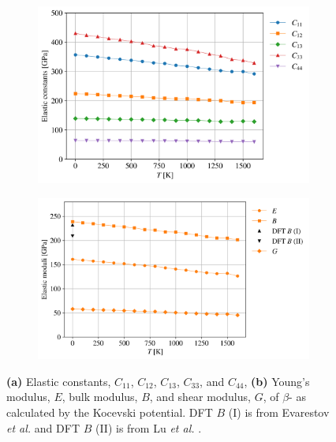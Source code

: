 \documentclass[preprint, 12pt]{elsarticle}
\begin{document}
\begin{figure}[h!]
\centering
\begin{subfigure}{0.43\textwidth}
    \includegraphics[width=\textwidth]{ElasticConstantsU2N3.png}
    \caption{}
    \label{Fig:ElasConstU2N3}
\end{subfigure}
\hfill
\begin{subfigure}{0.47\textwidth}
    \includegraphics[width=\textwidth]{ElasticModuliU2N3.png}
    \caption{}
    \label{Fig:ElasModU2N3}
\end{subfigure}
\hfill
\caption{\textbf{(a)} Elastic constants, $C_{11}$, $C_{12}$, $C_{13}$, $C_{33}$, and $C_{44}$, \textbf{(b)} Young's modulus, $E$, bulk modulus, $B$, and shear modulus, $G$, of $\beta$- as calculated by the Kocevski potential. DFT $B$ (I) is from Evarestov \textit{et al.} \cite{Evarestov2008} and DFT $B$ (II) is from Lu \textit{et al.} \cite{Lu2011}.}
\label{Fig:ECU2N3}
\end{figure}
\end{document}
